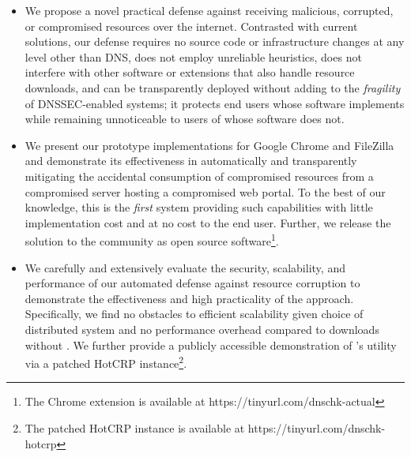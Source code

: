 \begin{itemize}

  \item We propose a novel practical defense against receiving malicious,
  corrupted, or compromised resources over the internet. Contrasted with current
  solutions, our defense requires no source code or infrastructure changes at
  any level other than DNS, does not employ unreliable heuristics, does not
  interfere with other software or extensions that also handle resource
  downloads, and can be transparently deployed without adding to the
  \textit{fragility} of DNSSEC-enabled systems; it protects end users whose
  software implements \SYSTEM{} while remaining unnoticeable to users of whose
  software does not.

  \item We present our prototype \SYSTEM{} implementations for Google Chrome and
  FileZilla and demonstrate its effectiveness in automatically and transparently
  mitigating the accidental consumption of compromised resources from a
  compromised server hosting a compromised web portal. To the best of our
  knowledge, this is the \emph{first} system providing such capabilities with
  little implementation cost and at no cost to the end user. Further, we release
  the \SYSTEM{} solution to the community as open source software\footnote{The
  Chrome extension is available at https://tinyurl.com/dnschk-actual}.

  \item We carefully and extensively evaluate the security, scalability, and
  performance of our automated defense against resource corruption to
  demonstrate the effectiveness and high practicality of the \SYSTEM{} approach.
  Specifically, we find no obstacles to efficient scalability given choice of
  distributed system and no performance overhead compared to downloads without
  \SYSTEM{}. We further provide a publicly accessible demonstration of
  \SYSTEM{}'s utility via a patched HotCRP instance\footnote{The patched HotCRP
  instance is available at https://tinyurl.com/dnschk-hotcrp}.

\end{itemize}
